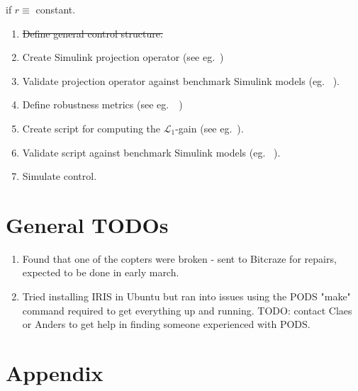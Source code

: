 \documentclass{article}
\begin{document}
if $r \equiv$ constant.
\begin{enumerate}
\subsubsection*{TODO}
\item \sout{Define general control structure.}
\item Create Simulink projection operator (see eg.~\cite{L1control})
\item Validate projection operator against benchmark Simulink models (eg. ~\cite{cao2006design}).
\item Define robustness metrics (see eg.~\cite{L1control}~\cite{huynh20141})
\item Create script for computing the $\mathcal{L}_1$-gain (see eg.~\cite{L1control}).
\item Validate script against benchmark Simulink models (eg. ~\cite{cao2006design}).
\item Simulate control.
\end{enumerate}

\section{General TODOs}
\begin{enumerate}
\item Found that one of the copters were broken - sent to Bitcraze for repairs, expected to be done in early march.
\item Tried installing IRIS in Ubuntu but ran into issues using the PODS "make" command required to get everything up and running. TODO: contact Claes or Anders to get help in finding someone experienced with PODS.
\end{enumerate}

\newpage{}


\section{Appendix}\label{sec:appendix}
\end{document}
